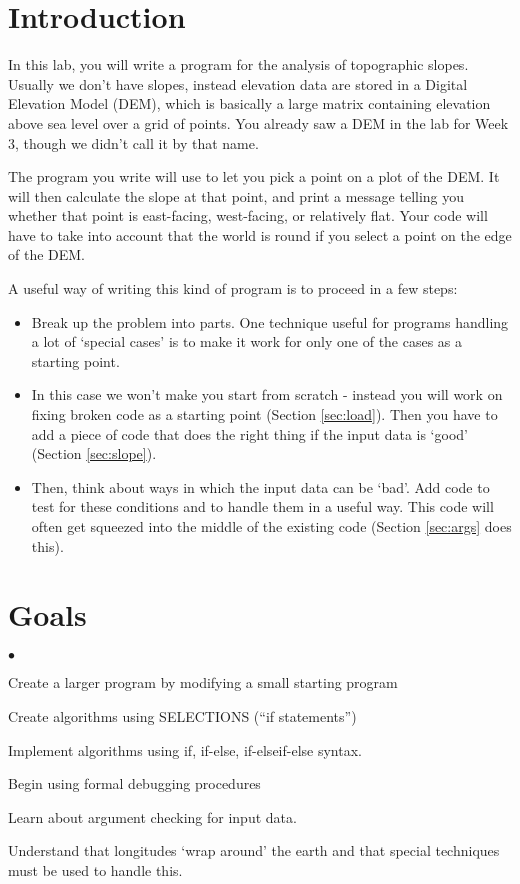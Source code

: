 \documentclass[letterpaper,12pt]{article}
\newcounter{lnum}
\newenvironment{abbrevlist}%
  {\begin{list}{$\bullet$}{\setlength{\leftmargin}{2em}%
               \setlength{\itemindent}{0em}%
               \setlength{\itemsep}{0pt}%
               \setlength{\parsep}{0pt}%
               \setlength{\topsep}{2pt}%
               \usecounter{lnum} } }{\end{list}}
\begin{document}
\section{Introduction}
In this lab, you will write a program for the analysis of topographic slopes. Usually
we don't have slopes, instead elevation data are stored in a  
Digital Elevation Model (DEM), which is basically a large matrix containing elevation above sea level
over a grid of points. You already saw a DEM in the lab for Week 3, though we didn't call it by that name.

The program you write will use  to 
let you pick a point on a plot of the DEM.
It will then calculate the slope at that point, and  print a message telling you whether
that point is east-facing, west-facing, or relatively flat. Your code will have to take into account that the world is round if you select a point on the edge of the DEM.

A useful way of writing this kind of program is to proceed
in a few steps:
\begin{itemize}
\item Break up the problem into parts. One technique useful for programs handling
a lot of `special cases' is to make it work for only one of the cases as a starting point. 

\item In this case we won't make you start from scratch - instead you will work on fixing broken code 
as a starting point (Section \ref{sec:load}). Then you have to add a piece of code that does the right thing if the input data is `good' (Section \ref{sec:slope}). 

\item Then, think about ways in which the input data can be `bad'. Add code
to test for these conditions and to handle them in a useful way. This code will often 
get squeezed into the middle of the existing code (Section \ref{sec:args} does this).
\end{itemize}

\section{Goals}

\begin{abbrevlist}
\item Create a larger program by modifying a small starting program
\item Create algorithms using SELECTIONS (``if statements'')
\item Implement algorithms using if, if-else, if-elseif-else syntax.
\item Begin using formal debugging procedures
\item Learn about argument checking for input data.
\item Understand that longitudes `wrap around' the earth and that
special techniques must be used to handle this.
\end{abbrevlist}
\end{document}

